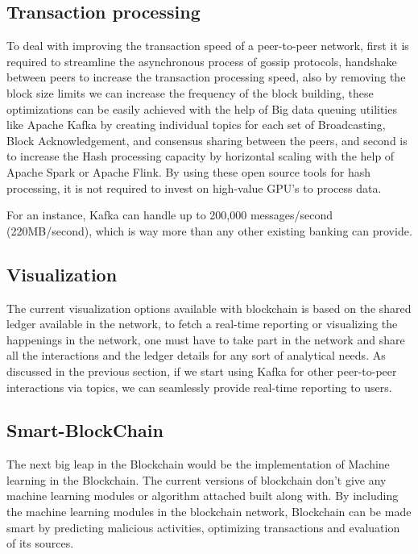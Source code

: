 \documentclass[sigconf]{acmart}
\begin{document}
\subsection{Transaction processing}
To deal with improving the transaction speed of a peer-to-peer network, first it is required to streamline the asynchronous process of gossip protocols, handshake between peers to increase the transaction processing speed, also by removing the block size limits\cite{Optimize-bitcoin} we can increase the frequency of the block building, these optimizations can be easily achieved with the help of Big data queuing utilities like Apache Kafka by creating individual topics for each set of Broadcasting, Block Acknowledgement, and consensus sharing between the peers,   and second is to increase the Hash processing capacity by horizontal scaling with the help of Apache Spark or Apache Flink. By using these open source tools for hash processing, it is not required to invest on high-value GPU's to process data.

For an instance, Kafka can handle up to 200,000 messages/second (220MB/second)\cite{kafka_performance}, which is way more than any other existing banking can provide.



\subsection{Visualization}
The current visualization options available with blockchain is based on the shared ledger available in the network, to fetch a real-time reporting or visualizing the happenings in the network, one must have to take part in the network and share all the interactions and the ledger details for any sort of analytical needs. As discussed in the previous section, if we start using Kafka for other peer-to-peer interactions via topics, we can seamlessly provide real-time reporting to users.

\subsection{Smart-BlockChain}
The next big leap in the Blockchain would be the implementation of Machine learning in the Blockchain. The current versions of blockchain don't give any machine learning modules or algorithm attached built along with. By including the machine learning modules in the blockchain network, Blockchain can be made smart by predicting malicious activities, optimizing transactions and evaluation of its sources.
\end{document}
